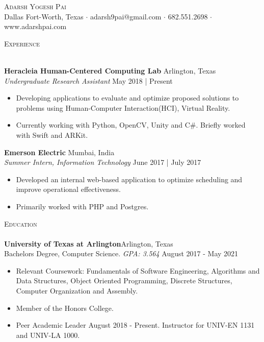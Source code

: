 \documentclass[a4paper]{article}
\newcommand{\lineunder} {
    \vspace*{-8pt} \\
    \hspace*{-18pt} \hrulefill \\
}
\newcommand{\header} [1] {
    {\hspace*{-18pt}\vspace*{6pt} \textsc{#1}}
    \vspace*{-6pt} \lineunder
}
\begin{document}
\vspace*{-40pt}

    


\vspace*{-10pt}
\begin{center}
	{\Huge \scshape {Adarsh Yogesh Pai}}\\
	Dallas Fort-Worth, Texas $\cdot$ adarsh9pai@gmail.com $\cdot$ 682.551.2698 $\cdot$ www.adarshpai.com\\
\end{center}

\header{Experience}
\vspace{1mm}

\textbf{Heracleia Human-Centered Computing Lab} \hfill Arlington, Texas\\
\textit{Undergraduate Research Assistant} \hfill May 2018 | Present\\
\vspace{-1mm}
\begin{itemize} \itemsep 1pt
	\item Developing applications to evaluate and optimize proposed solutions to problems using Human-Computer Interaction(HCI), Virtual Reality.  
    \item Currently working with Python, OpenCV, Unity and C\#. Briefly worked with Swift and ARKit.
\end{itemize}

\textbf{Emerson Electric} \hfill Mumbai, India\\
\textit{Summer Intern, Information Technology} \hfill June 2017 | July 2017\\
\vspace{-1mm}
\begin{itemize} \itemsep 1pt
	\item Developed an internal web-based application to optimize scheduling and improve operational effectiveness.
	\item Primarily worked with PHP and Postgres.
\end{itemize}


\header{Education}
\textbf{University of Texas at Arlington}\hfill Arlington, Texas\\
Bachelor\textquotesingle{}s Degree, Computer Science. \textit{GPA: 3.564} \hfill August 2017 - May 2021\\

\begin{itemize} \itemsep 1pt
	\item Relevant Coursework: Fundamentals of Software Engineering, Algorithms and Data Structures, Object Oriented Programming, Discrete Structures, Computer Organization and Assembly.
	\item Member of the Honors College.
    \item Peer Academic Leader August 2018 - Present. Instructor for UNIV-EN 1131 and UNIV-LA 1000.
\end{itemize}
\vspace{2mm}
\end{document}
